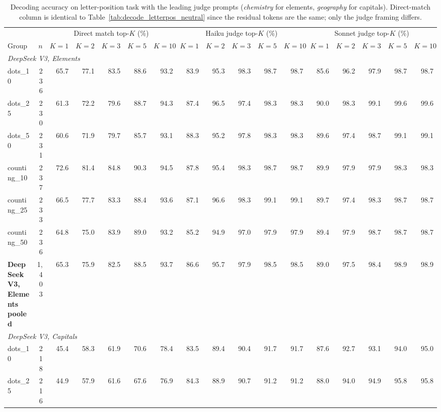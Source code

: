 \begin{table}[h]
\centering
\small
\caption{Decoding accuracy on letter-position task with the leading judge prompts (\emph{chemistry} for elements, \emph{geography} for capitals). Direct-match column is identical to Table~\ref{tab:decode_letterpos_neutral} since the residual tokens are the same; only the judge framing differs.}
\label{tab:decode_letterpos_leading}
\begin{tabular}{l r r r r r r r r r r r r r r r r}
\toprule
& & \multicolumn{5}{c}{Direct match top-$K$ (\%)} & \multicolumn{5}{c}{Haiku judge top-$K$ (\%)} & \multicolumn{5}{c}{Sonnet judge top-$K$ (\%)} \\
\cmidrule(lr){3-7} \cmidrule(lr){8-12} \cmidrule(lr){13-17}
Group & $n$ & $K{=}1$ & $K{=}2$ & $K{=}3$ & $K{=}5$ & $K{=}10$ & $K{=}1$ & $K{=}2$ & $K{=}3$ & $K{=}5$ & $K{=}10$ & $K{=}1$ & $K{=}2$ & $K{=}3$ & $K{=}5$ & $K{=}10$ \\
\midrule
\multicolumn{17}{l}{\textit{DeepSeek V3, Elements}} \\
dots\_10 & 236 & 65.7 & 77.1 & 83.5 & 88.6 & 93.2 & 83.9 & 95.3 & 98.3 & 98.7 & 98.7 & 85.6 & 96.2 & 97.9 & 98.7 & 98.7 \\
dots\_25 & 230 & 61.3 & 72.2 & 79.6 & 88.7 & 94.3 & 87.4 & 96.5 & 97.4 & 98.3 & 98.3 & 90.0 & 98.3 & 99.1 & 99.6 & 99.6 \\
dots\_50 & 231 & 60.6 & 71.9 & 79.7 & 85.7 & 93.1 & 88.3 & 95.2 & 97.8 & 98.3 & 98.3 & 89.6 & 97.4 & 98.7 & 99.1 & 99.1 \\
counting\_10 & 237 & 72.6 & 81.4 & 84.8 & 90.3 & 94.5 & 87.8 & 95.4 & 98.3 & 98.7 & 98.7 & 89.9 & 97.9 & 97.9 & 98.3 & 98.3 \\
counting\_25 & 233 & 66.5 & 77.7 & 83.3 & 88.4 & 93.6 & 87.1 & 96.6 & 98.3 & 99.1 & 99.1 & 89.7 & 97.4 & 98.3 & 98.7 & 98.7 \\
counting\_50 & 236 & 64.8 & 75.0 & 83.9 & 89.0 & 93.2 & 85.2 & 94.9 & 97.0 & 97.9 & 97.9 & 89.4 & 97.9 & 98.7 & 98.7 & 98.7 \\
\addlinespace[2pt]
\textbf{DeepSeek V3, Elements pooled} & 1,403 & 65.3 & 75.9 & 82.5 & 88.5 & 93.7 & 86.6 & 95.7 & 97.9 & 98.5 & 98.5 & 89.0 & 97.5 & 98.4 & 98.9 & 98.9 \\
\multicolumn{17}{l}{\textit{DeepSeek V3, Capitals}} \\
dots\_10 & 218 & 45.4 & 58.3 & 61.9 & 70.6 & 78.4 & 83.5 & 89.4 & 90.4 & 91.7 & 91.7 & 87.6 & 92.7 & 93.1 & 94.0 & 95.0 \\
dots\_25 & 216 & 44.9 & 57.9 & 61.6 & 67.6 & 76.9 & 84.3 & 88.9 & 90.7 & 91.2 & 91.2 & 88.0 & 94.0 & 94.9 & 95.8 & 95.8 \\

\end{tabular}
\end{table}
